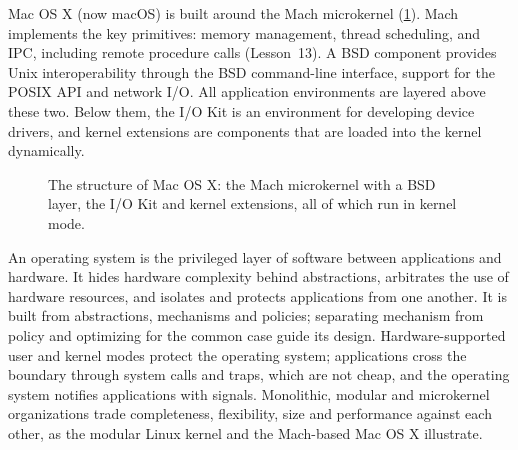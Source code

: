 \documentclass[../main.tex]{subfiles}
\begin{document}
Mac OS X (now macOS) is built around the Mach microkernel
(\cref{fig:l01-macos}).  Mach implements the key
primitives: memory management, thread scheduling, and IPC, including
remote procedure calls (Lesson~13).  A BSD component provides Unix
interoperability through the BSD command-line interface, support for the
POSIX API and network I/O.  All application environments are layered above
these two.  Below them, the I/O Kit is an environment for developing device
drivers, and kernel extensions are components that are loaded into the
kernel dynamically.

\begin{figure}[htbp]
  \centering
  
  \caption{The structure of Mac OS X: the Mach microkernel with a BSD
    layer, the I/O Kit and kernel extensions, all of which run in kernel
    mode.}
  \label{fig:l01-macos}
\end{figure}

\begin{keypoint}
  An operating system is the privileged layer of software between
  applications and hardware.  It hides hardware complexity behind
  abstractions, arbitrates the use of hardware resources, and isolates and
  protects applications from one another.  It is built from abstractions,
  mechanisms and policies; separating mechanism from policy and optimizing
  for the common case guide its design.  Hardware-supported user and kernel
  modes protect the operating system; applications cross the boundary
  through system calls and traps, which are not cheap, and the operating
  system notifies applications with signals.  Monolithic, modular and
  microkernel organizations trade completeness, flexibility, size and
  performance against each other, as the modular Linux kernel and the
  Mach-based Mac OS X illustrate.
\end{keypoint}
\end{document}
